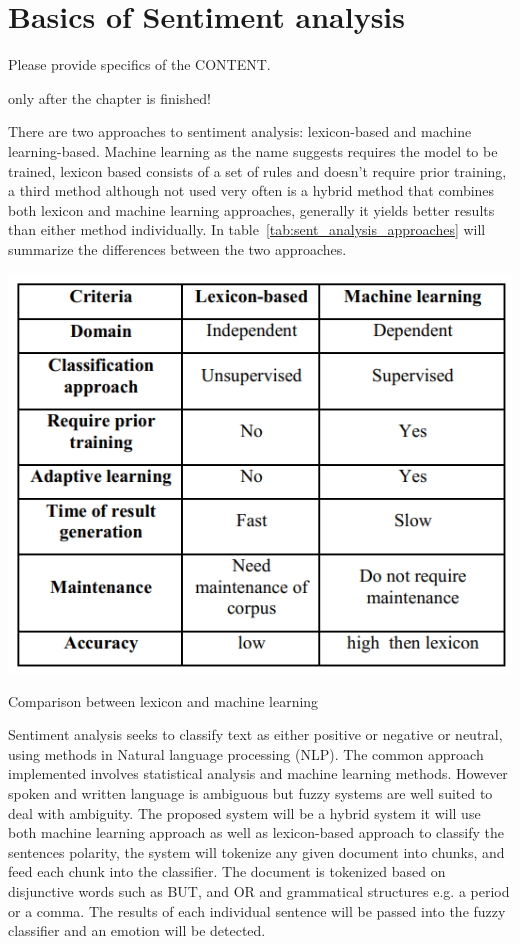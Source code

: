 \chapter{Basics of Sentiment analysis}\label{ch:THEORY}

\begin{summary}
  Please provide specifics of the CONTENT.
  
  only after the chapter is finished!
\end{summary}


There are two approaches to sentiment analysis: lexicon-based and machine learning-based. 
%
Machine learning as the name suggests requires the model to be trained, lexicon based consists of a set of rules and doesn’t require prior training, a third method although not used very often is a hybrid method that combines both lexicon and machine learning approaches, generally it yields better results than either method individually.
%
In table~\ref{tab:sent_analysis_approaches} will summarize the differences between the two approaches. 
 
\begin{table}[h]
  \centering
  \includegraphics[width=0.5\linewidth]{images/lex_vs_ml.png}
  \caption{Comparison between lexicon and machine learning}
  \label{tab:sent_analysis_approaches}
\end{table}

Sentiment analysis seeks to classify text as either positive or negative or neutral, using methods in Natural language processing (NLP). The common approach implemented involves statistical analysis and machine learning methods. However spoken and written language is ambiguous but fuzzy systems are well suited to deal with ambiguity. The proposed system will be a hybrid system it will use both machine learning approach as well as lexicon-based approach to classify the sentences polarity, the system will tokenize any given document into chunks, and feed each chunk into the classifier. The document is tokenized based on disjunctive words such as BUT, and OR and grammatical structures e.g. a period or a comma. The results of each individual sentence will be passed into the fuzzy classifier and an emotion will be detected.	

